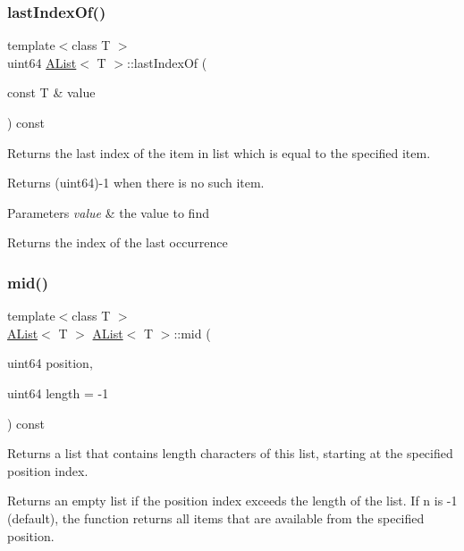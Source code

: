 \subsubsection{\texorpdfstring{lastIndexOf()}{lastIndexOf()}}
{\footnotesize\ttfamily template$<$class T $>$ \\
uint64 \mbox{\hyperlink{class_a_list}{A\+List}}$<$ T $>$\+::last\+Index\+Of (\begin{DoxyParamCaption}\item[{const T \&}]{value }\end{DoxyParamCaption}) const}



Returns the last index of the item in list which is equal to the specified item. 

Returns (uint64)-\/1 when there is no such item.


\begin{DoxyParams}{Parameters}
{\em value} & the value to find \\
\hline
\end{DoxyParams}
\begin{DoxyReturn}{Returns}
the index of the last occurrence 
\end{DoxyReturn}
\mbox{\label{class_a_list_a9ccaadf22f9f08197fee08bf6befcfdd}} 
\subsubsection{\texorpdfstring{mid()}{mid()}}
{\footnotesize\ttfamily template$<$class T $>$ \\
\mbox{\hyperlink{class_a_list}{A\+List}}$<$ T $>$ \mbox{\hyperlink{class_a_list}{A\+List}}$<$ T $>$\+::mid (\begin{DoxyParamCaption}\item[{uint64}]{position,  }\item[{uint64}]{length = {\ttfamily -\/1} }\end{DoxyParamCaption}) const}



Returns a list that contains length characters of this list, starting at the specified position index. 

Returns an empty list if the position index exceeds the length of the list. If n is -\/1 (default), the function returns all items that are available from the specified position.


